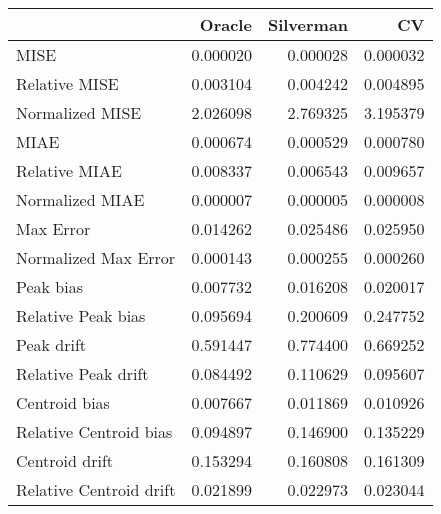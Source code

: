 \begin{tabular}{lrrr}
  \hline
 & Oracle & Silverman & CV \\ 
  \hline
MISE & 0.000020 & 0.000028 & 0.000032 \\ 
  Relative MISE & 0.003104 & 0.004242 & 0.004895 \\ 
  Normalized MISE & 2.026098 & 2.769325 & 3.195379 \\ 
  MIAE & 0.000674 & 0.000529 & 0.000780 \\ 
  Relative MIAE & 0.008337 & 0.006543 & 0.009657 \\ 
  Normalized MIAE & 0.000007 & 0.000005 & 0.000008 \\ 
  Max Error & 0.014262 & 0.025486 & 0.025950 \\ 
  Normalized Max Error & 0.000143 & 0.000255 & 0.000260 \\ 
  Peak bias & 0.007732 & 0.016208 & 0.020017 \\ 
  Relative Peak bias & 0.095694 & 0.200609 & 0.247752 \\ 
  Peak drift & 0.591447 & 0.774400 & 0.669252 \\ 
  Relative Peak drift & 0.084492 & 0.110629 & 0.095607 \\ 
  Centroid bias & 0.007667 & 0.011869 & 0.010926 \\ 
  Relative Centroid bias & 0.094897 & 0.146900 & 0.135229 \\ 
  Centroid drift & 0.153294 & 0.160808 & 0.161309 \\ 
  Relative Centroid drift & 0.021899 & 0.022973 & 0.023044 \\ 
   \hline
\end{tabular}
